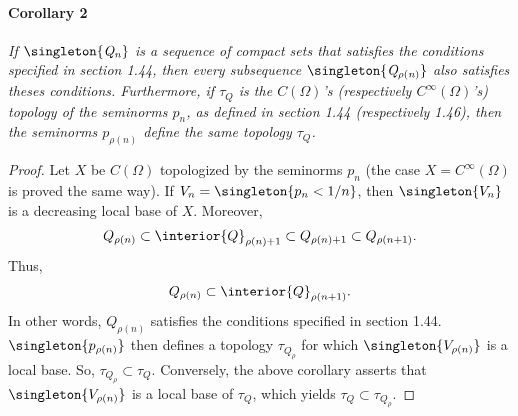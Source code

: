 \paragraph{Corollary 2}{\it %
If 
%
  $\mathit{\mathit{\singleton{Q_n}}}$ 
%
is a sequence of compact sets that satisfies the conditions specified 
in section 1.44, then every subsequence 
%
  $\mathit{\singleton{Q_{\rho(n)}}}$ 
%
also satisfies theses conditions.
%
Furthermore, if $\mathit{\tau_{Q}}$ is the $\mathit{C(\Omega)}$'s 
(respectively $\mathit{C^\infty (\Omega)}$'s) topology of the seminorms %
$\mathit{p_{n}}$, 
as defined in section 1.44 (respectively 1.46), then the seminorms 
%
  $\mathit{p_{\rho(n)}}$ 
%
define the same topology $\mathit{\tau_{Q}}$. %
}
%
\begin{proof}%
%
Let $X$ be $C(\Omega)$ topologized by the seminorms $p_{n}$ 
(the case $X=C^\infty(\Omega)$ is proved the same way).
%
If 
    $V_{n} = \singleton{p_{n} < 1/n}$, 
then 
    $\singleton{V_{n}}$ 
is a decreasing local base of $X$.
%
Moreover,
% 
  \begin{align}
    Q_{\rho(n)} 
      \subset 
    \interior{Q}_{\rho(n) + 1} 
      \subset 
    Q_{\rho(n) + 1} 
      \subset 
    Q_{\rho(n+ 1)}.
  \end{align}
% 
Thus,
%
  \begin{align}
    Q_{\rho(n)} 
      \subset 
    \interior{Q}_{\rho(n+ 1)}.
  \end{align}
%
In other words, 
%
  $Q_{\rho(n)}$ satisfies the conditions specified in section 1.44.
%
%
  $\singleton{p_{\rho(n)}}$
% 
then defines a topology $\tau_{Q_\rho}$ for which  
% 
  $\singleton{V_{\rho(n)}}$ 
%
is a local base. So, 
% 
  $\tau_{Q_\rho} \subset \tau_{Q}$.
%
Conversely, the above corollary asserts that 
%
  $\singleton{V_{\rho(n)}}$ 
%
is a local base of $\tau_{Q}$, which yields  
%
  $\tau_{Q}\subset \tau_{Q_\rho}$.
%
\end{proof}
